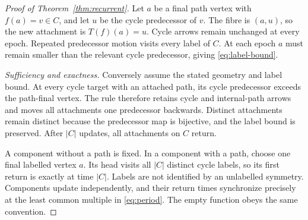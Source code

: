 \begin{proof}[Proof of Theorem~\ref{thm:recurrent}]
Let $a$ be a final path vertex with $f(a)=v\in C$, and let $u$ be the
cycle predecessor of $v$. The fibre is $(a,u)$, so the new attachment is
$T(f)(a)=u$. Cycle arrows remain unchanged at every epoch. Repeated
predecessor motion visits every label of $C$. At each epoch $a$ must
remain smaller than the relevant cycle predecessor, giving
\eqref{eq:label-bound}.

\emph{Sufficiency and exactness.}
Conversely assume the stated geometry and label bound. At every cycle
target with an attached path, its cycle predecessor exceeds the path-final
vertex. The rule therefore retains cycle and internal-path arrows and
moves all attachments one predecessor backwards. Distinct attachments
remain distinct because the predecessor map is bijective, and the label
bound is preserved. After $|C|$ updates, all attachments on $C$ return.

A component without a path is fixed. In a component with a path, choose
one final labelled vertex $a$. Its head visits all $|C|$ distinct cycle
labels, so its first return is exactly at time $|C|$. Labels are not
identified by an unlabelled symmetry. Components update independently,
and their return times synchronize precisely at the least common multiple
in \eqref{eq:period}. The empty function obeys the same convention.
\end{proof}
